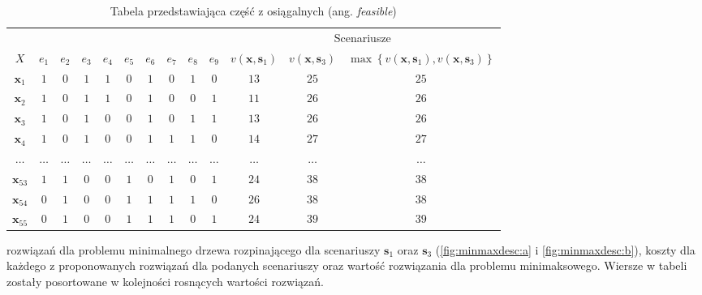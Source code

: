 \begin{table}[!htbp]
	\begin{tabular}{ccccccccccccc}
		\cline{11-13}
		\multicolumn{2}{l}{}       &         &         &         &         &         &         &         &         & \multicolumn{3}{c}{Scenariusze}                                                                                                                                                                                              \\
		$X$              & $e_{1}$ & $e_{2}$ & $e_{3}$ & $e_{4}$ & $e_{5}$ & $e_{6}$ & $e_{7}$ & $e_{8}$ & $e_{9}$ & $v \left( \textbf{x}, \textbf{s}_{1} \right) $ & $ v \left( \textbf{x}, \textbf{s}_{3} \right) $ & $\max \left\{ v \left( \textbf{x}, \textbf{s}_{1} \right), v \left( \textbf{x}, \textbf{s}_{3} \right) \right\} $ \\
		$\textbf{x}_{1}$ & $1$     & $0$     & $1$     & $1$     & $0$     & $1$     & $0$     & $1$	&	$0$	&	$13$	&	$25$	&	$25$	\\
		$\textbf{x}_{2}$ & $1$     & $0$     & $1$     & $1$     & $0$     & $1$     & $0$     & $0$	&	$1$	&	$11$	&	$26$	&	$26$	\\
		$\textbf{x}_{3}$ & $1$     & $0$     & $1$     & $0$     & $0$     & $1$     & $0$     & $1$	&	$1$	&	$13$	&	$26$	&	$26$	\\
		$\textbf{x}_{4}$ & $1$     & $0$     & $1$     & $0$     & $0$     & $1$     & $1$     & $1$	&	$0$	&	$14$	&	$27$	&	$27$	\\
		$\dots$ & $\dots$     & $\dots$     & $\dots$     & $\dots$     & $\dots$     & $\dots$     & $\dots$     & $\dots$	&	$\dots$	&	$\dots$	&	$\dots$	&	$\dots$	\\
		$\textbf{x}_{53}$ & $1$     & $1$     & $0$     & $0$     & $1$     & $0$     & $1$     & $0$	&	$1$	&	$24$	&	$38$	&	$38$	\\
		$\textbf{x}_{54}$ & $0$     & $1$     & $0$     & $0$     & $1$     & $1$     & $1$     & $1$	&	$0$	&	$26$	&	$38$	&	$38$	\\
		$\textbf{x}_{55}$ & $0$     & $1$     & $0$     & $0$     & $1$     & $1$     & $1$     & $0$	&	$1$	&	$24$	&	$39$	&	$39$	\\
		 \hline
	\end{tabular}
	\caption{Tabela przedstawiająca część z osiągalnych (ang. \textit{feasible})} rozwiązań dla problemu minimalnego drzewa rozpinającego dla scenariuszy $\textbf{s}_{1}$ oraz $\textbf{s}_{3}$ (\ref{fig:minmaxdesc:a} i \ref{fig:minmaxdesc:b}), koszty dla każdego z proponowanych rozwiązań dla podanych scenariuszy oraz wartość rozwiązania dla problemu minimaksowego. Wiersze w tabeli zostały posortowane w kolejności rosnących wartości rozwiązań.
	\label{tab:minmaxexample}
\end{table}

